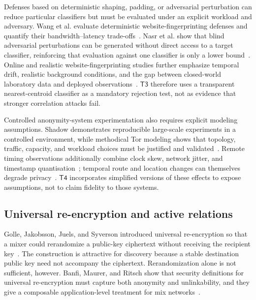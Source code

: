 \documentclass[11pt,oneside]{article}
\newcommand{\Tthree}{\ensuremath{\mathsf{T3}}}
\newcommand{\Tfour}{\ensuremath{\mathsf{T4}}}
\begin{document}
Defenses based on deterministic shaping, padding, or adversarial perturbation can reduce particular classifiers but must be evaluated under an explicit workload and adversary. Wang et al. evaluate deterministic website-fingerprinting defenses and quantify their bandwidth--latency trade-offs~\cite{wang2014wf}. Nasr et al. show that blind adversarial perturbations can be generated without direct access to a target classifier, reinforcing that evaluation against one classifier is only a lower bound~\cite{blindperturb}. Online and realistic website-fingerprinting studies further emphasize temporal drift, realistic background conditions, and the gap between closed-world laboratory data and deployed observations~\cite{onlinewf,gtt23,realitycheck2026}. \Tthree{} therefore uses a transparent nearest-centroid classifier as a mandatory rejection test, not as evidence that stronger correlation attacks fail.

Controlled anonymity-system experimentation also requires explicit modeling assumptions. Shadow demonstrates reproducible large-scale experiments in a controlled environment, while methodical Tor modeling shows that topology, traffic, capacity, and workload choices must be justified and validated~\cite{shadow2012,tormodel2012}. Remote timing observations additionally combine clock skew, network jitter, and timestamp quantisation~\cite{clockskew2008}; temporal route and location changes can themselves degrade privacy~\cite{tempest2018}. \Tfour{} incorporates simplified versions of these effects to expose assumptions, not to claim fidelity to those systems.

\subsection{Universal re-encryption and active relations}

Golle, Jakobsson, Juels, and Syverson introduced universal re-encryption so that a mixer could rerandomize a public-key ciphertext without receiving the recipient key~\cite{gjjs}. The construction is attractive for discovery because a stable destination public key need not accompany the ciphertext. Rerandomization alone is not sufficient, however. Banfi, Maurer, and Ritsch show that security definitions for universal re-encryption must capture both anonymity and unlinkability, and they give a composable application-level treatment for mix networks~\cite{ure2023}.
\end{document}
